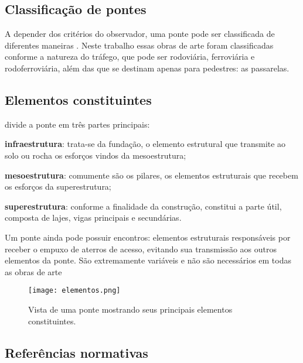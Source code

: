 \subsection{Classificação de pontes}

A depender dos critérios do observador, uma ponte pode ser classificada de diferentes maneiras \cite[p.~3]{Pfeil}. Neste trabalho essas obras de arte foram classificadas conforme a natureza do tráfego,
que pode ser rodoviária, ferroviária e rodoferroviária, além das que se destinam apenas para pedestres: as
passarelas.

\subsection{Elementos constituintes}

 divide a ponte em três partes principais:

\begin{alineas}[label=\textbullet]
  \item \textbf{infraestrutura}: trata-se da fundação, o elemento estrutural que transmite ao solo ou rocha os esforços vindos da mesoestrutura;
  \item \textbf{mesoestrutura}: comumente são os pilares, os elementos estruturais que recebem os esforços da superestrutura;
  \item \textbf{superestrutura}: conforme a finalidade da construção, constitui a parte útil, composta de lajes, vigas principais e secundárias.
\end{alineas}

Um ponte ainda pode possuir encontros: elementos estruturais responsáveis por receber o
empuxo de aterros de acesso, evitando sua transmissão aos outros elementos da ponte. São extremamente
variáveis e não são necessários em todas as obras de arte \cite[p.~1]{Pfeil}

\begin{figure}[htb]
	\caption{\label{elementos}Vista de uma ponte mostrando seus principais elementos constituintes.}
	\begin{center}
	    \texttt{[image: elementos.png]}
	\end{center}
\end{figure}

\subsection{Referências normativas}

